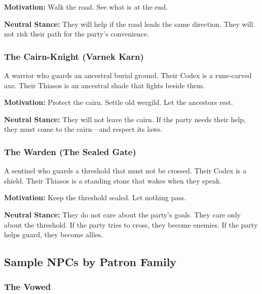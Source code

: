 \textbf{Motivation:} Walk the road. See what is at the end.

\textbf{Neutral Stance:} They will help if the road leads the same direction. They will not risk their path for the party's convenience.

\subsubsection{The Cairn-Knight (Varnek Karn)}

A warrior who guards an ancestral burial ground. Their Codex is a rune-carved axe. Their Thiasos is an ancestral shade that fights beside them.

\textbf{Motivation:} Protect the cairn. Settle old wergild. Let the ancestors rest.

\textbf{Neutral Stance:} They will not leave the cairn. If the party needs their help, they must come to the cairn—and respect its laws.

\subsubsection{The Warden (The Sealed Gate)}

A sentinel who guards a threshold that must not be crossed. Their Codex is a shield. Their Thiasos is a standing stone that wakes when they speak.

\textbf{Motivation:} Keep the threshold sealed. Let nothing pass.

\textbf{Neutral Stance:} They do not care about the party's goals. They care only about the threshold. If the party tries to cross, they become enemies. If the party helps guard, they become allies.

\subsection{Sample NPCs by Patron Family}

\subsubsection{The Vowed}

